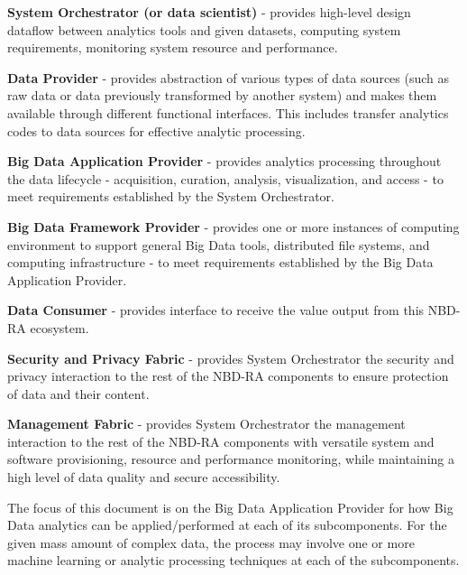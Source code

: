 \begin{description}

\item  {\bf System Orchestrator (or data scientist)} - provides high-level 
design dataflow between analytics tools and given datasets, computing system requirements, 
monitoring system resource and performance.


\item {\bf Data Provider} - provides abstraction of various types of 
data sources (such as raw data or data previously transformed by another system) 
and makes them available through different functional interfaces. This includes 
transfer analytics codes to data sources for effective analytic processing.


\item {\bf Big Data Application Provider} - provides analytics processing 
throughout the data lifecycle - acquisition, curation, analysis, visualization, 
and access - to meet requirements established by the System Orchestrator.


\item {\bf Big Data Framework Provider} - provides one or more instances 
of computing environment to support general Big Data tools, distributed file systems, 
and computing infrastructure - to meet requirements established by the Big Data 
Application Provider.


\item  {\bf Data Consumer} - provides interface to receive the value output 
from this NBD-RA ecosystem.


\item  {\bf Security and Privacy Fabric} - provides System Orchestrator 
the security and privacy interaction to the rest of the NBD-RA components to ensure 
protection of data and their content.


\item {\bf Management Fabric} - provides System Orchestrator the management 
interaction to the rest of the NBD-RA components with versatile system and software 
provisioning, resource and performance monitoring, while maintaining a high level 
of data quality and secure accessibility.

\end{description}


The focus of this document is on the Big Data Application Provider for how Big 
Data analytics can be applied/performed at each of its subcomponents. For the given 
mass amount of complex data, the process may involve one or more machine learning 
or analytic processing techniques at each of the subcomponents. 



